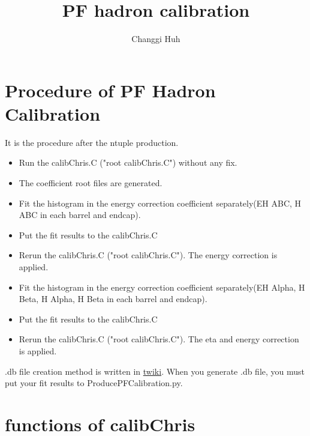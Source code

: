 \documentclass{cernrep}
\begin{document}
\title{PF hadron calibration}
\author{Changgi Huh}

\maketitle
\section{Procedure of PF Hadron Calibration}

It is the procedure after the ntuple production. 
\begin{itemize}
    \item Run the calibChris.C ("root calibChris.C") without any fix.
    \item The coefficient root files are generated.
    \item Fit the histogram in the energy correction coefficient separately(EH ABC, H ABC in each barrel and endcap).  
    \item Put the fit results to the calibChris.C
    \item Rerun the calibChris.C ("root calibChris.C"). The energy correction is applied. 
    \item Fit the histogram in the energy correction coefficient separately(EH Alpha, H Beta, H Alpha, H Beta in each barrel and endcap).
    \item Put the fit results to the calibChris.C
    \item Rerun the calibChris.C ("root calibChris.C"). The eta and energy correction is applied. 
\end{itemize}

.db file creation method is written in \href{https://twiki.cern.ch/twiki/bin/viewauth/CMS/PFCalibrationDBConditions#How_to_write_create_payload}{twiki}. When you generate .db file, you must put your fit results to ProducePFCalibration.py.




\section{functions of calibChris}
\end{document}
